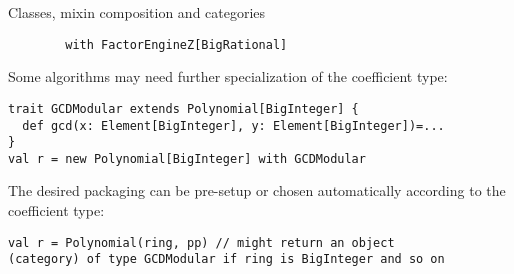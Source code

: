 \documentclass[final]{beamer}
\begin{document}
\begin{frame}[fragile]
\begin{columns}[t]
\begin{column}{.3\linewidth}
\begin{block}{\large Classes, mixin composition and categories}
\begin{lstlisting}
        with FactorEngineZ[BigRational]
\end{lstlisting}
{\footnotesize Some algorithms may need further specialization
of the coefficient type:}\par
\begin{lstlisting}
trait GCDModular extends Polynomial[BigInteger] {
  def gcd(x: Element[BigInteger], y: Element[BigInteger])=...
}
val r = new Polynomial[BigInteger] with GCDModular
\end{lstlisting}
{\footnotesize The desired packaging can be pre-setup or chosen
automatically according to the coefficient type:}\par
\begin{lstlisting}
val r = Polynomial(ring, pp) // might return an object
(category) of type GCDModular if ring is BigInteger and so on
\end{lstlisting}
  \end{block}
  \hfill
\end{column}

\end{columns}

\end{frame}


%
%
%
%
%
\end{document}
